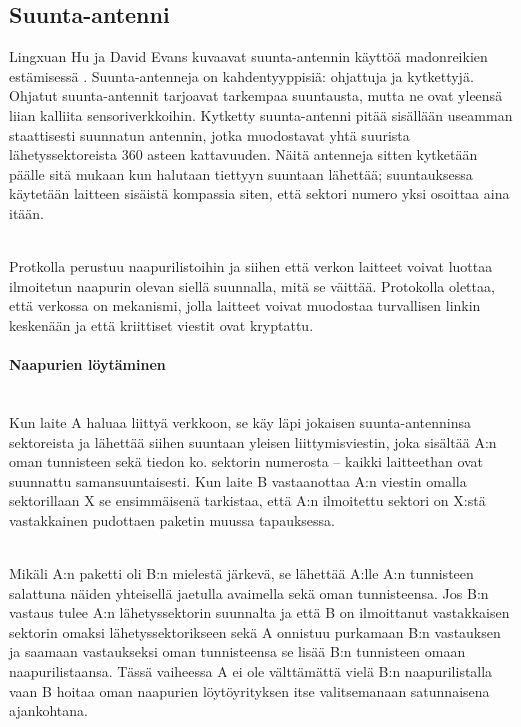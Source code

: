 \documentclass[finnish]{tktltiki2}
\theoremstyle{definition}
\theoremstyle{remark}
\begin{document}
\subsection{Suunta-antenni}
Lingxuan Hu ja David Evans kuvaavat suunta-antennin käyttöä madonreikien estämisessä \cite{antenna}. Suunta-antenneja on kahdentyyppisiä: ohjattuja ja kytkettyjä. Ohjatut suunta-antennit tarjoavat tarkempaa suuntausta, mutta ne ovat yleensä liian kalliita sensoriverkkoihin. Kytketty suunta-antenni pitää sisällään useamman staattisesti suunnatun antennin, jotka muodostavat yhtä suurista lähetyssektoreista 360 asteen kattavuuden. Näitä antenneja sitten kytketään päälle sitä mukaan kun halutaan tiettyyn suuntaan lähettää; suuntauksessa käytetään laitteen sisäistä kompassia siten, että sektori numero yksi osoittaa aina itään.

\noindent \\
Protkolla perustuu naapurilistoihin ja siihen että verkon laitteet voivat luottaa ilmoitetun naapurin olevan siellä suunnalla, mitä se väittää. Protokolla olettaa, että verkossa on mekanismi, jolla laitteet voivat muodostaa turvallisen linkin keskenään ja että kriittiset viestit ovat kryptattu.

\paragraph{Naapurien löytäminen}
\noindent\\
Kun laite A haluaa liittyä verkkoon, se käy läpi jokaisen suunta-antenninsa sektoreista ja lähettää siihen suuntaan yleisen liittymisviestin, joka sisältää A:n oman tunnisteen sekä tiedon ko. sektorin numerosta -- kaikki laitteethan ovat suunnattu samansuuntaisesti. Kun laite B vastaanottaa A:n viestin omalla sektorillaan X se ensimmäisenä tarkistaa, että A:n ilmoitettu sektori on X:stä vastakkainen pudottaen paketin muussa tapauksessa.

\noindent\\
Mikäli A:n paketti oli B:n mielestä järkevä, se lähettää A:lle A:n tunnisteen salattuna näiden yhteisellä jaetulla avaimella sekä oman tunnisteensa. Jos B:n vastaus tulee A:n lähetyssektorin suunnalta ja että B on ilmoittanut vastakkaisen sektorin omaksi lähetyssektorikseen sekä A onnistuu purkamaan B:n vastauksen ja saamaan vastaukseksi oman tunnisteensa se lisää B:n tunnisteen omaan naapurilistaansa. Tässä vaiheessa A ei ole välttämättä vielä B:n naapurilistalla vaan B hoitaa oman naapurien löytöyrityksen itse valitsemanaan satunnaisena ajankohtana.
\end{document}
